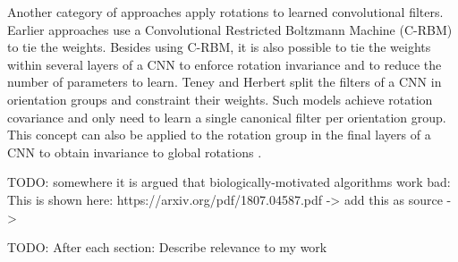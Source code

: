 Another category of approaches apply rotations to learned convolutional filters.
Earlier approaches  use a Convolutional Restricted Boltzmann Machine (C-RBM)  to tie the weights.
Besides using C-RBM, it is also possible to tie the weights within several layers of a CNN to enforce rotation invariance and to reduce the number of parameters to learn. 
Teney and Herbert  split the filters of a CNN in orientation groups and constraint their weights.
Such models achieve rotation covariance and only need to learn a single canonical filter per orientation group.
This concept can also be applied to the rotation group in the final layers of a CNN to obtain invariance to global rotations .









TODO: somewhere it is argued that biologically-motivated algorithms work bad: This is shown here: https://arxiv.org/pdf/1807.04587.pdf -> add this as source -> 

TODO: After each section: Describe relevance to my work